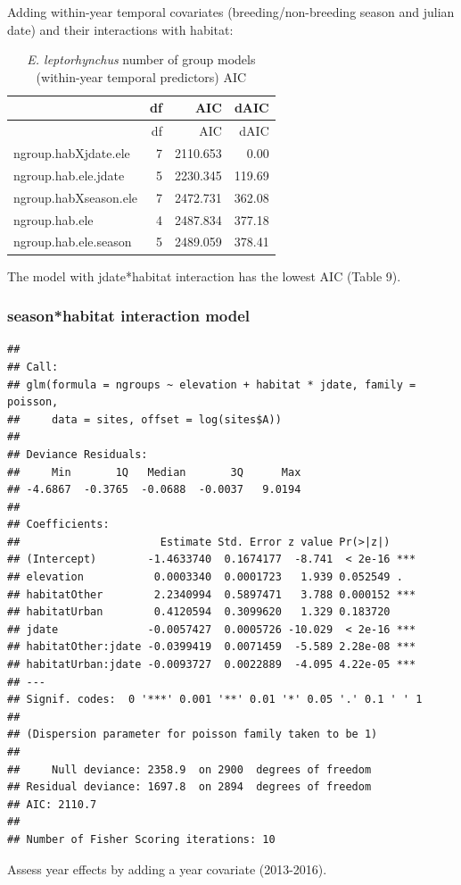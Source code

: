 \documentclass[]{article}
\begin{document}
Adding within-year temporal covariates (breeding/non-breeding season and
julian date) and their interactions with habitat:

\begin{longtable}[]{@{}lrrr@{}}
\caption{\textit{E. leptorhynchus} number of group models (within-year
temporal predictors) AIC}\tabularnewline
\toprule
& df & AIC & dAIC\tabularnewline
\midrule
\endfirsthead
\toprule
& df & AIC & dAIC\tabularnewline
\midrule
\endhead
ngroup.habXjdate.ele & 7 & 2110.653 & 0.00\tabularnewline
ngroup.hab.ele.jdate & 5 & 2230.345 & 119.69\tabularnewline
ngroup.habXseason.ele & 7 & 2472.731 & 362.08\tabularnewline
ngroup.hab.ele & 4 & 2487.834 & 377.18\tabularnewline
ngroup.hab.ele.season & 5 & 2489.059 & 378.41\tabularnewline
\bottomrule
\end{longtable}

The model with jdate*habitat interaction has the lowest AIC (Table 9).

\subsubsection{season*habitat interaction
model}\label{seasonhabitat-interaction-model-1}

\begin{verbatim}
## 
## Call:
## glm(formula = ngroups ~ elevation + habitat * jdate, family = poisson, 
##     data = sites, offset = log(sites$A))
## 
## Deviance Residuals: 
##     Min       1Q   Median       3Q      Max  
## -4.6867  -0.3765  -0.0688  -0.0037   9.0194  
## 
## Coefficients:
##                      Estimate Std. Error z value Pr(>|z|)    
## (Intercept)        -1.4633740  0.1674177  -8.741  < 2e-16 ***
## elevation           0.0003340  0.0001723   1.939 0.052549 .  
## habitatOther        2.2340994  0.5897471   3.788 0.000152 ***
## habitatUrban        0.4120594  0.3099620   1.329 0.183720    
## jdate              -0.0057427  0.0005726 -10.029  < 2e-16 ***
## habitatOther:jdate -0.0399419  0.0071459  -5.589 2.28e-08 ***
## habitatUrban:jdate -0.0093727  0.0022889  -4.095 4.22e-05 ***
## ---
## Signif. codes:  0 '***' 0.001 '**' 0.01 '*' 0.05 '.' 0.1 ' ' 1
## 
## (Dispersion parameter for poisson family taken to be 1)
## 
##     Null deviance: 2358.9  on 2900  degrees of freedom
## Residual deviance: 1697.8  on 2894  degrees of freedom
## AIC: 2110.7
## 
## Number of Fisher Scoring iterations: 10
\end{verbatim}

Assess year effects by adding a year covariate (2013-2016).
\end{document}

